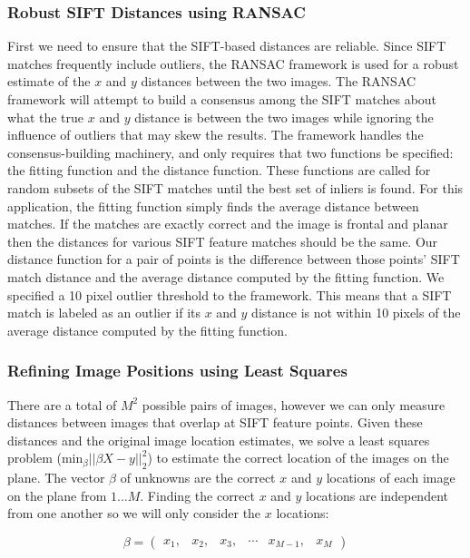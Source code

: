 \documentclass[runningheads]{llncs}
\begin{document}
\subsubsection{Robust SIFT Distances using RANSAC}

First we need to ensure that the SIFT-based distances are reliable. Since SIFT matches frequently include outliers, the RANSAC framework \cite{fischler1981random} is used for a robust estimate of the $x$ and $y$ distances between the two images. The RANSAC framework will attempt to build a consensus among the SIFT matches about what the true $x$ and $y$ distance is between the two images while ignoring the influence of outliers that may skew the results. The framework handles the consensus-building machinery, and only requires that two functions be specified: the fitting function and the distance function. These functions are called for random subsets of the SIFT matches until the best set of inliers is found. For this application, the fitting function simply finds the average distance between matches. If the matches are exactly correct and the image is frontal and planar then the distances for various SIFT feature matches should be the same. Our distance function for a pair of points is the difference between those points' SIFT match distance and the average distance computed by the fitting function. We specified a 10 pixel outlier threshold to the framework. This means that a SIFT match is labeled as an outlier if its $x$ and $y$ distance is not within 10 pixels of the average distance computed by the fitting function.

\subsubsection{Refining Image Positions using Least Squares}

There are a total of $M^{2}$ possible pairs of images, however we can only measure distances between images that overlap at SIFT feature points. Given these distances and the original image location estimates, we solve a least squares problem ($\textrm{min}_{\beta} ||\beta X - y||_2^2 $) to estimate the correct location of the images on the plane. The vector $\beta$ of unknowns are the correct $x$ and $y$ locations of each image on the plane from $1 \dots M$. Finding the correct $x$ and $y$ locations are independent from one another so we will only consider the $x$ locations:


\[\beta =
 \begin{pmatrix}
  x_1, & x_2, & x_3, & \cdots & x_{M-1}, & x_M
 \end{pmatrix}
\]
\end{document}
